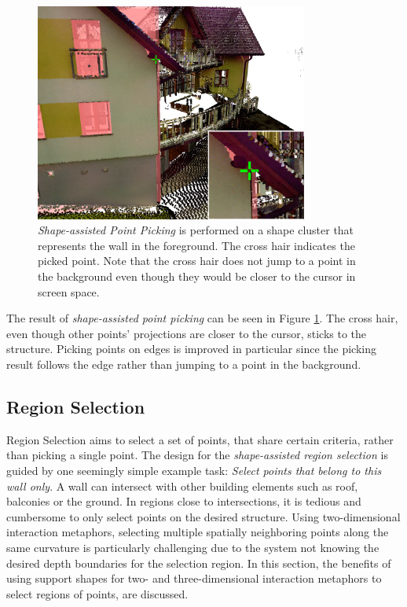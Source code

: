\begin{figure}
    \centering
    \includegraphics[width=0.8\textwidth]{System_Design/picking_assisted_screenshot.png}%
    \caption[Screenshot of Shape-assisted Point Picking]
		{\textit{Shape-assisted Point Picking} is performed on a shape cluster that represents the wall in the foreground. The cross hair indicates the picked point. Note that the cross hair does not jump to a point in the background even though they would be closer to the cursor in screen space. }
    \label{fig:picking_assisted_screenshot}
\end{figure}

The result of \textit{shape-assisted point picking} can be seen in Figure \ref{fig:picking_assisted_screenshot}. The cross hair, even though other points' projections are closer to the cursor, sticks to the structure. Picking points on edges is improved in particular since the picking result follows the edge rather than jumping to a point in the background. 


\subsection{Region Selection}
\label{sec:regionSelection}

Region Selection aims to select a set of points, that share certain criteria, rather than picking a single point. 
The design for the \textit{shape-assisted region selection} is guided by one seemingly simple example task: \textit{Select points that belong to this wall only}. A wall can intersect with other building elements such as roof, balconies or the ground. In regions close to intersections, it is tedious and cumbersome to only select points on the desired structure. Using two-dimensional interaction metaphors, selecting multiple spatially neighboring points along the same curvature is particularly challenging due to the system not knowing the desired depth boundaries for the selection region. In this section, the benefits of using support shapes for two- and three-dimensional interaction metaphors to select regions of points,  are discussed. 


